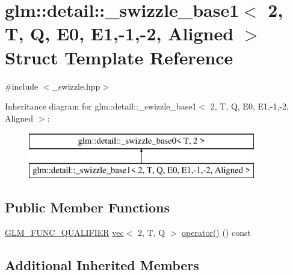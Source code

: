 \hypertarget{structglm_1_1detail_1_1__swizzle__base1_3_012_00_01_t_00_01_q_00_01_e0_00_01_e1_00-1_00-2_00_01_aligned_01_4}{}\section{glm\+:\+:detail\+:\+:\+\_\+swizzle\+\_\+base1$<$ 2, T, Q, E0, E1,-\/1,-\/2, Aligned $>$ Struct Template Reference}
\label{structglm_1_1detail_1_1__swizzle__base1_3_012_00_01_t_00_01_q_00_01_e0_00_01_e1_00-1_00-2_00_01_aligned_01_4}


{\ttfamily \#include $<$\+\_\+swizzle.\+hpp$>$}

Inheritance diagram for glm\+:\+:detail\+:\+:\+\_\+swizzle\+\_\+base1$<$ 2, T, Q, E0, E1,-\/1,-\/2, Aligned $>$\+:\begin{figure}[H]
\begin{center}
\leavevmode
\includegraphics[height=2.000000cm]{structglm_1_1detail_1_1__swizzle__base1_3_012_00_01_t_00_01_q_00_01_e0_00_01_e1_00-1_00-2_00_01_aligned_01_4}
\end{center}
\end{figure}
\subsection*{Public Member Functions}
\begin{DoxyCompactItemize}
\item 
\mbox{\hyperlink{setup_8hpp_a33fdea6f91c5f834105f7415e2a64407}{G\+L\+M\+\_\+\+F\+U\+N\+C\+\_\+\+Q\+U\+A\+L\+I\+F\+I\+ER}} \mbox{\hyperlink{structglm_1_1vec}{vec}}$<$ 2, T, Q $>$ \mbox{\hyperlink{structglm_1_1detail_1_1__swizzle__base1_3_012_00_01_t_00_01_q_00_01_e0_00_01_e1_00-1_00-2_00_01_aligned_01_4_ae4bac86c7894c7c68590818deb920945}{operator()}} () const
\end{DoxyCompactItemize}
\subsection*{Additional Inherited Members}


